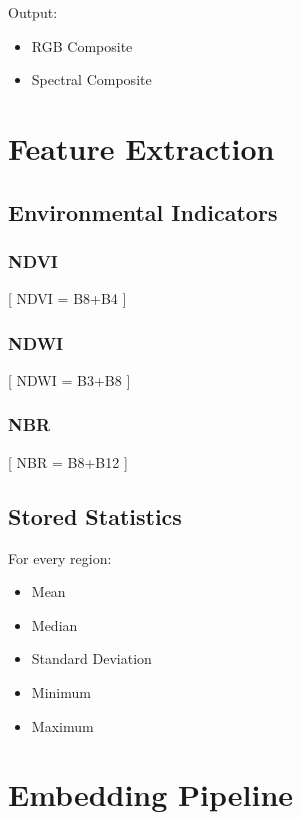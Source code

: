 \documentclass[11pt,a4paper]{article}
\begin{document}
Output:

\begin{itemize}
\item RGB Composite
\item Spectral Composite
\end{itemize}

\section{Feature Extraction}

\subsection{Environmental Indicators}

\subsubsection{NDVI}

[
NDVI =
{B8+B4}
]

\subsubsection{NDWI}

[
NDWI =
{B3+B8}
]

\subsubsection{NBR}

[
NBR =
{B8+B12}
]

\subsection{Stored Statistics}

For every region:

\begin{itemize}
\item Mean
\item Median
\item Standard Deviation
\item Minimum
\item Maximum
\end{itemize}

\section{Embedding Pipeline}
\end{document}
